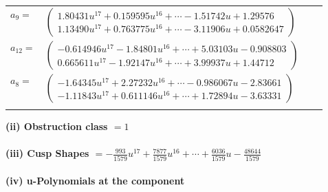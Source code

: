 \documentclass[1p]{elsarticle_modified}
\theoremstyle{definition}
\begin{document}
\begin{tabular}{m{7pt} m{180pt} m{7pt} m{180pt} }
\flushright $a_{9}=$&$\begin{pmatrix}1.80431 u^{17}+0.159595 u^{16}+\cdots-1.51742 u+1.29576\\1.13490 u^{17}+0.763775 u^{16}+\cdots-3.11906 u+0.0582647\end{pmatrix}$ \\
\flushright $a_{12}=$&$\begin{pmatrix}-0.614946 u^{17}-1.84801 u^{16}+\cdots+5.03103 u-0.908803\\0.665611 u^{17}-1.92147 u^{16}+\cdots+3.99937 u+1.44712\end{pmatrix}$ \\
\flushright $a_{8}=$&$\begin{pmatrix}-1.64345 u^{17}+2.27232 u^{16}+\cdots-0.986067 u-2.83661\\-1.11843 u^{17}+0.611146 u^{16}+\cdots+1.72894 u-3.63331\end{pmatrix}$\\&\end{tabular}
\flushleft \textbf{(ii) Obstruction class $= 1$}\\~\\
\flushleft \textbf{(iii) Cusp Shapes $= -\frac{993}{1579} u^{17}+\frac{7877}{1579} u^{16}+\cdots+\frac{6036}{1579} u-\frac{48644}{1579}$}\\~\\
\newpage\renewcommand{\arraystretch}{1}
\flushleft \textbf{(iv) u-Polynomials at the component}\newline \\
\end{document}
